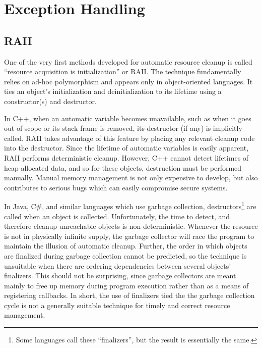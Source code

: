 \documentclass[11pt]{article}
\begin{document}
\section{Exception Handling}

\subsection{RAII}
\label{RAII}

One of the very first methods developed for automatic resource cleanup is called ``resource acquisition is initialization'' or RAII.
The technique fundamentally relies on ad-hoc polymorphism and appears only in object-oriented languages.
It ties an object's initialization and deinitialization to its lifetime using a constructor(s) and destructor.

In C++, when an automatic variable becomes unavailable, such as when it goes out of scope or its stack frame is removed, its destructor (if any) is implicitly called.
RAII takes advantage of this feature by placing any relevant cleanup code into the destructor.\cite{cplusplusLanguage}
Since the lifetime of automatic variables is easily apparent, RAII performs deterministic cleanup.
However, C++ cannot detect lifetimes of heap-allocated data, and so for these objects, destruction must be performed manually.
Manual memory management is not only expensive to develop, but also contributes to serious bugs which can easily compromise secure systems.\cite{WeimerNecula08}


In Java, C\#, and similar languages which use garbage collection, destructors\footnote{Some languages call these ``finalizers'', but the result is essentially the same.} are called when an object is collected.
Unfortunately, the time to detect, and therefore cleanup unreachable objects is non-deterministic.\cite{JavaStandard}\cite{cSharpStandard}
Whenever the resource is not in physically infinite supply, the garbage collector will race the program to maintain the illusion of automatic cleanup.\cite{WeimerNecula08}
Further, the order in which objects are finalized during garbage collection cannot be predicted, so the technique is unsuitable when there are ordering dependencies between several objects' finalizers.\cite{WeimerNecula08}
This should not be surprising, since garbage collectors are meant mainly to free up memory during program execution rather than as a means of registering callbacks.
In short, the use of finalizers tied the the garbage collection cycle is not a generally suitable technique for timely and correct resource management.
\end{document}
